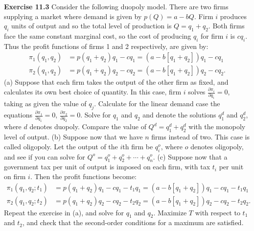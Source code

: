 \begin{original}
\textbf{Exercise 11.3} Consider the following duopoly model. There are two firms supplying a market where demand is given by $p(Q) = a - bQ$. Firm $i$ produces $q_i$ units of output and so the total level of production is $Q = q_1 + q_2$. Both firms face the same constant marginal cost, so the cost of producing $q_i$ for firm $i$ is $c q_i$. Thus the profit functions of firms 1 and 2 respectively, are given by:
\begin{align*}
\pi_1(q_1, q_2) &= p(q_1 + q_2)q_1 - c q_1 = (a - b[q_1 + q_2])q_1 - c q_1 \\
\pi_2(q_1, q_2) &= p(q_1 + q_2)q_2 - c q_2 = (a - b[q_1 + q_2])q_2 - c q_2.
\end{align*}
(a) Suppose that each firm takes the output of the other firm as fixed, and calculates its own best choice of quantity. In this case, firm $i$ solves $\frac{\partial \pi_i}{\partial q_i} = 0$, taking as given the value of $q_j$. Calculate for the linear demand case the equations $\frac{\partial \pi_1}{\partial q_1} = 0$, $\frac{\partial \pi_2}{\partial q_2} = 0$. Solve for $q_1$ and $q_2$ and denote the solutions $q_1^d$ and $q_2^d$, where $d$ denotes duopoly. Compare the value of $Q^d = q_1^d + q_2^d$ with the monopoly level of output.
(b) Suppose now that we have $n$ firms instead of two. This case is called oligopoly. Let the output of the $i$th firm be $q_i^o$, where $o$ denotes oligopoly, and see if you can solve for $Q^o = q_1^o + q_2^o + \cdots + q_n^o$.
(c) Suppose now that a government tax per unit of output is imposed on each firm, with tax $t_i$ per unit on firm $i$. Then the profit functions become:
\begin{align*}
\pi_1(q_1, q_2; t_1) &= p(q_1 + q_2)q_1 - c q_1 - t_1 q_1 = (a - b[q_1 + q_2])q_1 - c q_1 - t_1 q_1 \\
\pi_2(q_1, q_2; t_2) &= p(q_1 + q_2)q_2 - c q_2 - t_2 q_2 = (a - b[q_1 + q_2])q_2 - c q_2 - t_2 q_2.
\end{align*}
Repeat the exercise in (a), and solve for $q_1$ and $q_2$. Maximize $T$ with respect to $t_1$ and $t_2$, and check that the second-order conditions for a maximum are satisfied.


\end{original}
